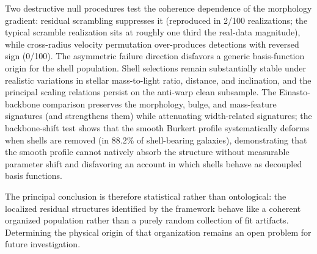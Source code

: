 \documentclass[linenumbers,trackchanges]{aastex701}
\begin{document}
Two destructive null procedures test the coherence dependence of the morphology gradient: residual scrambling suppresses it (reproduced in 2/100 realizations; the typical scramble realization sits at roughly one third the real-data magnitude), while cross-radius velocity permutation over-produces detections with reversed sign (0/100). The asymmetric failure direction disfavors a generic basis-function origin for the shell population. Shell selections remain substantially stable under realistic variations in stellar mass-to-light ratio, distance, and inclination, and the principal scaling relations persist on the anti-warp clean subsample. The Einasto-backbone comparison preserves the morphology, bulge, and mass-feature signatures (and strengthens them) while attenuating width-related signatures; the backbone-shift test shows that the smooth Burkert profile systematically deforms when shells are removed (in 88.2\% of shell-bearing galaxies), demonstrating that the smooth profile cannot natively absorb the structure without measurable parameter shift and disfavoring an account in which shells behave as decoupled basis functions.

The principal conclusion is therefore statistical rather than ontological: the localized residual structures identified by the framework behave like a coherent organized population rather than a purely random collection of fit artifacts. Determining the physical origin of that organization remains an open problem for future investigation.
\end{document}
